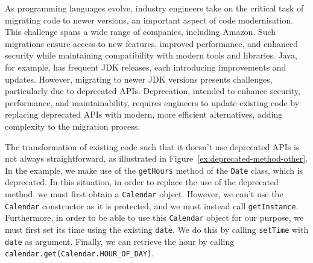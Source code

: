 \documentclass[sigconf]{acmart}
\begin{document}

As programming languages evolve, industry engineers take on the critical task of migrating code to newer versions, an important aspect of code modernisation. This challenge spans a wide range of companies, including Amazon. Such migrations ensure access to new features, improved performance, and enhanced security while maintaining compatibility with modern tools and libraries. Java, for example, has frequent JDK releases, each introducing improvements and updates. However, migrating to newer JDK versions presents challenges, particularly due to deprecated APIs. Deprecation, intended to enhance security, performance, and maintainability, requires engineers to update existing code by replacing deprecated APIs with modern, more efficient alternatives, adding complexity to the migration process. %









The transformation of existing code such that it doesn't use
deprecated APIs is not always straightforward, as illustrated in
Figure~\ref{ex:deprecated-method-other}. In the example, we make use of
the \lstinline[breaklines=true]{getHours} method of the \lstinline[breaklines=true]{Date} class, which is
deprecated.  In this situation, in order to replace the use of the
deprecated method, we must first obtain a \lstinline[breaklines=true]{Calendar} object.
However, we can't use the \lstinline[breaklines=true]{Calendar} constructor as it is
protected, and we must instead call \lstinline[breaklines=true]{getInstance}.
Furthermore, in order to be able to use this \lstinline[breaklines=true]{Calendar} object
for our purpose, we must first set its time using the existing
\lstinline[breaklines=true]{date}.  We do this by calling \lstinline[breaklines=true]{setTime} with
\lstinline[breaklines=true]{date} as argument.  Finally, we can retrieve the hour by
calling \lstinline[breaklines=true]{calendar.get(Calendar.HOUR_OF_DAY)}.
\end{document}
